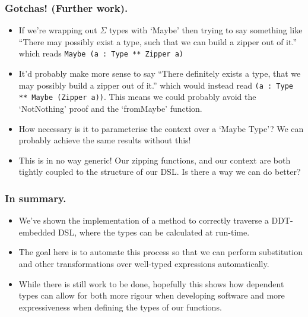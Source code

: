 \documentclass{beamer}
\begin{document}
\begin{frame}[fragile]
  \frametitle{Gotchas! (Further work).}
  \begin{itemize}
    \item If we're wrapping out $\Sigma$ types with `Maybe' then
      trying to say something like ``There may possibly exist a type,
      such that we can build a zipper out of it.'' which reads
      \texttt{Maybe (a : Type ** Zipper a)}
    \item It'd probably make more sense to say ``There definitely exists a
      type, that we may possibly build a zipper out of it.'' which would
        instead read \texttt{(a : Type ** Maybe (Zipper a))}.
        This means we could probably avoid the `NotNothing' proof and the
        `fromMaybe' function.
    \item How necessary is it to parameterise the context over a `Maybe Type'?
      We can probably achieve the same results without this!
    \item This is in no way generic! Our zipping functions, and our context
      are both tightly coupled to the structure of our DSL. Is there a way we
      can do better?
  \end{itemize}
\end{frame}

\begin{frame}[fragile]
  \frametitle{In summary.}
  \begin{itemize}
    \item We've shown the implementation of a method to correctly traverse a
      DDT-embedded DSL, where the types can be calculated at run-time.
    \item The goal here is to automate this process so that we can perform
      substitution and other transformations over well-typed expressions
      automatically.
    \item While there is still work to be done, hopefully this shows how
      dependent types can allow for both more rigour when developing software
      and more expressiveness when defining the types of our functions.
  \end{itemize}
\end{frame}
\end{document}

